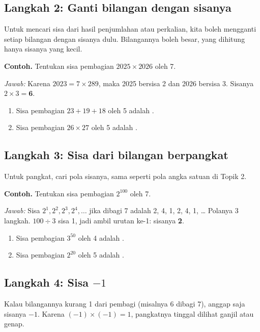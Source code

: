 \documentclass[11pt,a4paper]{article}
\begin{document}
\subsection*{Langkah 2: Ganti bilangan dengan sisanya}
Untuk mencari sisa dari hasil penjumlahan atau perkalian, kita boleh mengganti setiap bilangan
dengan sisanya dulu. Bilangannya boleh besar, yang dihitung hanya sisanya yang kecil.

\begin{contoh}
\textbf{Contoh.} Tentukan sisa pembagian $2025 \times 2026$ oleh 7.

\textit{Jawab:} Karena $2023 = 7 \times 289$, maka 2025 bersisa 2 dan 2026 bersisa 3.
Sisanya $2 \times 3 = \textbf{6}$.
\end{contoh}

\begin{giliranmu}
\begin{enumerate}[label=\alph*.]
    \item Sisa pembagian $23 + 19 + 18$ oleh 5 adalah \kosong.
    \item Sisa pembagian $26 \times 27$ oleh 5 adalah \kosong.
\end{enumerate}
\end{giliranmu}

\subsection*{Langkah 3: Sisa dari bilangan berpangkat}
Untuk pangkat, cari pola sisanya, sama seperti pola angka satuan di Topik 2.

\begin{contoh}
\textbf{Contoh.} Tentukan sisa pembagian $2^{100}$ oleh 7.

\textit{Jawab:} Sisa $2^1, 2^2, 2^3, 2^4, \dots$ jika dibagi 7 adalah 2, 4, 1, 2, 4, 1, \dots{}
Polanya 3 langkah. $100 \div 3$ sisa 1, jadi ambil urutan ke-1: sisanya \textbf{2}.
\end{contoh}

\begin{giliranmu}
\begin{enumerate}[label=\alph*.]
    \item Sisa pembagian $3^{50}$ oleh 4 adalah \kosong.
    \item Sisa pembagian $2^{20}$ oleh 5 adalah \kosong.
\end{enumerate}
\end{giliranmu}

\subsection*{Langkah 4: Sisa $-1$}
Kalau bilangannya kurang 1 dari pembagi (misalnya 6 dibagi 7), anggap saja sisanya $-1$.
Karena $(-1) \times (-1) = 1$, pangkatnya tinggal dilihat ganjil atau genap.
\end{document}

